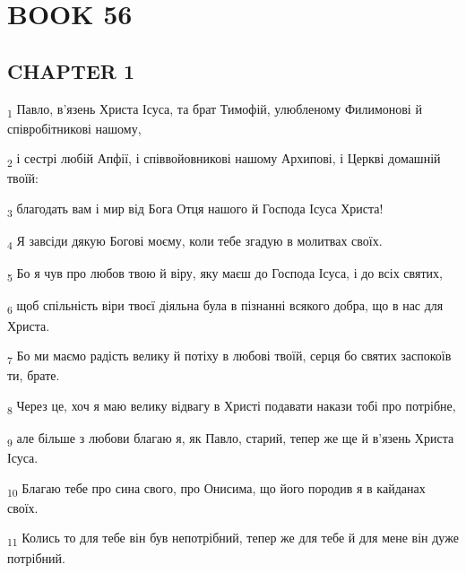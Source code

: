 \section{BOOK 56}
\subsection{CHAPTER 1}
\begin{tcolorbox}
\textsubscript{1} Павло, в'язень Христа Ісуса, та брат Тимофій, улюбленому Филимонові й співробітникові нашому,
\end{tcolorbox}
\begin{tcolorbox}
\textsubscript{2} і сестрі любій Апфії, і співвойовникові нашому Архипові, і Церкві домашній твоїй:
\end{tcolorbox}
\begin{tcolorbox}
\textsubscript{3} благодать вам і мир від Бога Отця нашого й Господа Ісуса Христа!
\end{tcolorbox}
\begin{tcolorbox}
\textsubscript{4} Я завсіди дякую Богові моєму, коли тебе згадую в молитвах своїх.
\end{tcolorbox}
\begin{tcolorbox}
\textsubscript{5} Бо я чув про любов твою й віру, яку маєш до Господа Ісуса, і до всіх святих,
\end{tcolorbox}
\begin{tcolorbox}
\textsubscript{6} щоб спільність віри твоєї діяльна була в пізнанні всякого добра, що в нас для Христа.
\end{tcolorbox}
\begin{tcolorbox}
\textsubscript{7} Бо ми маємо радість велику й потіху в любові твоїй, серця бо святих заспокоїв ти, брате.
\end{tcolorbox}
\begin{tcolorbox}
\textsubscript{8} Через це, хоч я маю велику відвагу в Христі подавати накази тобі про потрібне,
\end{tcolorbox}
\begin{tcolorbox}
\textsubscript{9} але більше з любови благаю я, як Павло, старий, тепер же ще й в'язень Христа Ісуса.
\end{tcolorbox}
\begin{tcolorbox}
\textsubscript{10} Благаю тебе про сина свого, про Онисима, що його породив я в кайданах своїх.
\end{tcolorbox}
\begin{tcolorbox}
\textsubscript{11} Колись то для тебе він був непотрібний, тепер же для тебе й для мене він дуже потрібний.
\end{tcolorbox}
